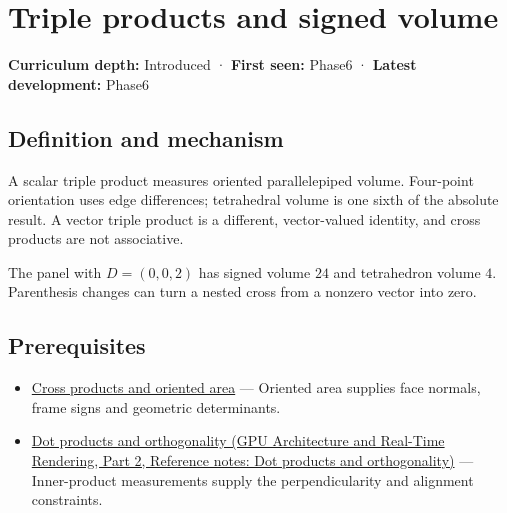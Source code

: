 \hypertarget{appendix-5caa058bd9c7}{}\label{referencestart:appendix-5caa058bd9c7}
\section{Triple products and signed volume}\label{appendix-5caa058bd9c7-triple-products-and-signed-volume}

\hypertarget{appendix-5caa058bd9c7-triple-products-and-signed-volume}{}

\textbf{Curriculum depth:} Introduced · \textbf{First seen:} Phase6 · \textbf{Latest development:} Phase6

\begin{allmightroledefinition}

\subsection{Definition and mechanism}\label{appendix-5caa058bd9c7-definition-and-mechanism}

\hypertarget{appendix-5caa058bd9c7-definition-and-mechanism}{}

A scalar triple product measures oriented parallelepiped volume. Four-point orientation uses edge differences; tetrahedral volume is one sixth of the absolute result. A vector triple product is a different, vector-valued identity, and cross products are not associative.

\end{allmightroledefinition}

The panel with \(D=(0,0,2)\) has signed volume \(24\) and tetrahedron volume \(4\). Parenthesis changes can turn a nested cross from a nonzero vector into zero.

\subsection{Prerequisites}\label{appendix-5caa058bd9c7-prerequisites}

\hypertarget{appendix-5caa058bd9c7-prerequisites}{}

\begin{itemize}
\tightlist
\item
  \hyperref[appendix-2391db8052b1]{Cross products and oriented area} --- Oriented area supplies face normals, frame signs and geometric determinants.
\item
  \href{../06-GPU-Architecture-and-Real-Time-Rendering-P02/main.pdf\#nameddest=appendix-8bc4e8fc547c}{Dot products and orthogonality (GPU Architecture and Real-Time Rendering, Part 2, Reference notes: Dot products and orthogonality)} --- Inner-product measurements supply the perpendicularity and alignment constraints.
\end{itemize}

